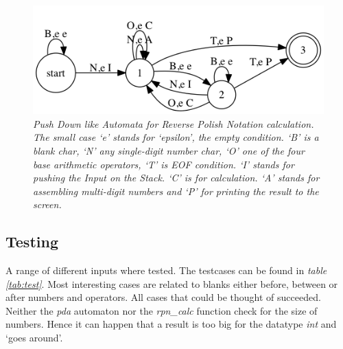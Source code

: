\documentclass[a4paper,11pt,twoside]{article}
\begin{document}
\begin{figure}
 \centering
  \includegraphics[width=\textwidth]{rpn}
  \caption{\textit{Push Down like Automata for Reverse Polish Notation 
calculation. The small case `e' stands for `epsilon', the empty
condition. `B' is a blank char, `N' any single-digit number char, `O'
one of the four base arithmetic operators, `T' is EOF condition. `I'
stands for pushing the Input on the Stack. `C' is for calculation. `A'
stands for assembling multi-digit numbers and `P' for printing the
result to the screen.}} 
  \label{fig:rpn}
\end{figure}




\subsection{Testing}
A range of different inputs where tested. The testcases can be found
in \textit{table \ref{tab:test}}. Most interesting cases are related
to blanks either before, between or after numbers and operators. All
cases that could be thought of succeeded. Neither the \textit{pda} automaton
nor the \textit{rpn\_calc} function check for the size of
numbers. Hence it can happen that a result is too big for the datatype
\textit{int} and `goes around'.  
\end{document}
